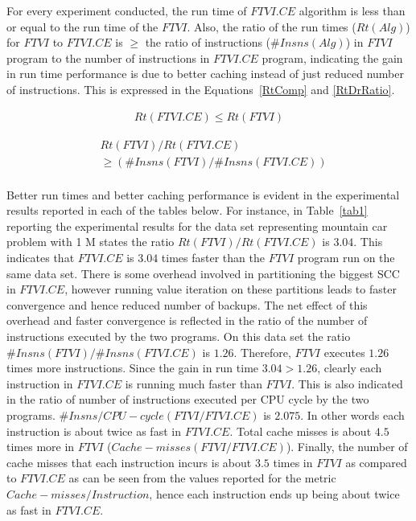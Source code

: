 \documentclass[conference]{IEEEtran}
\begin{document}
For every experiment conducted, the run time of $FTVI.CE$ algorithm is less than or equal to the run time of the $FTVI$. Also, the ratio of the run times ($Rt(Alg)$) for $FTVI$ to $FTVI.CE$ is $\ge$ the ratio of instructions ($\#Insns(Alg)$) in $FTVI$ program to the number of instructions in $FTVI.CE$ program, indicating the gain in run time performance is due to better caching instead of just reduced number of instructions. This is expressed in the Equations~\ref{RtComp} and \ref{RtDrRatio}.

\begin {equation}
\label{RtComp}
\begin{aligned}
Rt(FTVI.CE) \le Rt(FTVI)
\end{aligned}
\end {equation}

\begin {equation}
\label{RtDrRatio}
\begin{aligned}
&Rt(FTVI)/Rt(FTVI.CE) \\
&\ge(\#Insns(FTVI)/\#Insns(FTVI.CE)) \\
\end{aligned}
\end {equation}

Better run times and better caching performance is evident in the experimental results reported in each of the tables below. For instance, in Table~\ref{tab1} reporting the experimental results for the data set representing mountain car problem with 1 M states the ratio $Rt(FTVI)/Rt(FTVI.CE)$ is $3.04$. This indicates that $FTVI.CE$ is $3.04$ times faster than the $FTVI$ program run on the same data set. There is some overhead involved in partitioning the biggest SCC in $FTVI.CE$, however running value iteration on these partitions leads to faster convergence and hence reduced number of backups. The net effect of this overhead and faster convergence is reflected in the ratio of the number of instructions executed by the two programs. On this data set the ratio $\#Insns(FTVI)/\#Insns(FTVI.CE)$ is $1.26$. Therefore, $FTVI$ executes $1.26$ times more instructions. Since the gain in run time $3.04 > 1.26$, clearly each instruction in $FTVI.CE$ is running much faster than $FTVI$. This is also indicated in the ratio of number of instructions executed per CPU cycle by the two programs. $\#Insns/CPU-cycle(FTVI/FTVI.CE)$ is $2.075$. In other words each instruction is about twice as fast in $FTVI.CE$. Total cache misses is about $4.5$ times more in $FTVI$ ($Cache-misses(FTVI/FTVI.CE)$). Finally, the number of cache misses that each instruction incurs is about $3.5$ times in $FTVI$ as compared to $FTVI.CE$ as can be seen from the values reported for the metric $Cache-misses/Instruction$, hence each instruction ends up being about twice as fast in $FTVI.CE$.
\end{document}
